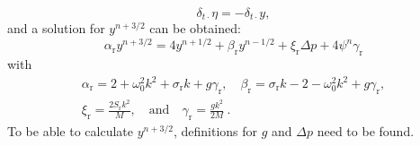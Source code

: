 \begin{equation}\label{eq:etaNegY} 
    \delta_{t\cdot}\eta = -\delta_{t\cdot}y,
\end{equation}
and a solution for $y^{n+3/2}$ can be obtained:
\begin{equation}\label{eq:lipUpdateWithCollision}
    \alpha_\text{r}y^{n+3/2} = 4 y^{n+1/2} + \beta_\text{r}y^{n-1/2} + \xi_\text{r}\Delta p + 4\psi^n\gamma_\text{r}
\end{equation}
with
\begin{gather}
    \alpha_\text{r} = 2 + \omega_0^2 k^2 + \sigma_\text{r} k + g\gamma_\text{r}, \quad \beta_\text{r} = \sigma_\text{r}k - 2 - \omega_0^2k^2 + g\gamma_\text{r}, \nonumber \\[10pt]
    \xi_\text{r} = \frac{2S_\text{r}k^2}{M}, \quad \text{and} \quad \gamma_\text{r} = \frac{gk^2}{2M}\ .\nonumber
\end{gather}
To be able to calculate $y^{n+3/2}$, definitions for $g$ and $\Delta p$ need to be found. 

